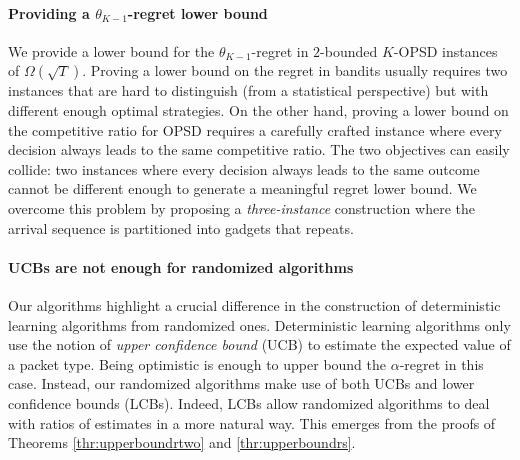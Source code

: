 \paragraph{Providing a $\theta_{K-1}$-regret lower bound} We provide a lower bound for the $\theta_{K-1}$-regret in $2$-bounded $K$-OPSD instances of $\Omega\left(\sqrt{T}\right)$. Proving a lower bound on the regret in bandits usually requires two instances that are hard to distinguish (from a statistical perspective) but with different enough optimal strategies. On the other hand, proving a lower bound on the competitive ratio for OPSD requires a carefully crafted instance where every decision always leads to the same competitive ratio. The two objectives can easily collide: two instances where every decision always leads to the same outcome cannot be different enough to generate a meaningful regret lower bound. We overcome this problem by proposing a \textit{three-instance} construction where the arrival sequence is partitioned into gadgets that repeats.
\paragraph{UCBs are not enough for randomized algorithms}
Our algorithms highlight a crucial difference in the construction of deterministic learning algorithms from randomized ones. Deterministic learning algorithms only use the notion of \textit{upper confidence bound} (UCB) to estimate the expected value of a packet type. Being optimistic is enough to upper bound the $\alpha$-regret in this case. Instead, our randomized algorithms make use of both UCBs and lower confidence bounds (LCBs). Indeed, LCBs allow randomized algorithms to deal with ratios of estimates in a more natural way. This emerges from the proofs of Theorems \ref{thr:upperboundrtwo} and \ref{thr:upperboundrs}.